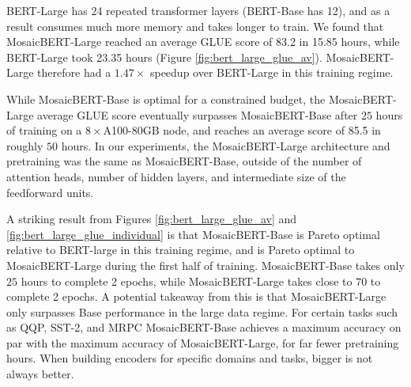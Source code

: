 \documentclass{article}
\begin{document}
BERT-Large has 24 repeated transformer layers (BERT-Base has 12), and as a result consumes much more memory and takes longer to train. We found that MosaicBERT-Large reached an average GLUE score of 83.2 in 15.85 hours, while BERT-Large took 23.35 hours (Figure \ref{fig:bert_large_glue_av}).
MosaicBERT-Large therefore had a $1.47\times$ speedup over BERT-Large in this training regime.

While MosaicBERT-Base is optimal for a constrained budget, the MosaicBERT-Large average GLUE score eventually surpasses MosaicBERT-Base after $25$ hours of training on a $8\times$A100-80GB node, and reaches an average score of 85.5 in roughly $50$ hours.
In our experiments, the MosaicBERT-Large architecture and pretraining was the same as MosaicBERT-Base, outside of the number of attention heads, number of hidden layers, and intermediate size of the feedforward units.

A striking result from Figures \ref{fig:bert_large_glue_av} and \ref{fig:bert_large_glue_individual} is that MosaicBERT-Base is Pareto optimal relative to BERT-large in this training regime, and is Pareto optimal to MosaicBERT-Large during the first half of training.  MosaicBERT-Base takes only $25$ hours to complete 2 epochs, while MosaicBERT-Large takes close to $70$ to complete 2 epochs. A potential takeaway from this is that MosaicBERT-Large only surpasses Base performance in the large data regime. For certain tasks such as QQP, SST-2, and MRPC MosaicBERT-Base achieves a maximum accuracy on par with the maximum accuracy of MosaicBERT-Large, for far fewer pretraining hours. When building encoders for specific domains and tasks, bigger is not always better.



\end{document}
